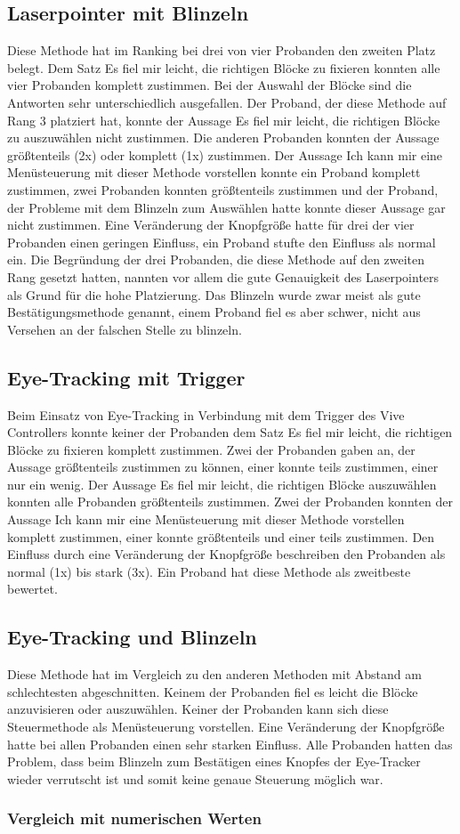 \subsection{Laserpointer mit Blinzeln}
Diese Methode hat im Ranking bei drei von vier Probanden den zweiten Platz belegt. Dem Satz \glqq Es fiel mir leicht, die richtigen Blöcke zu fixieren\grqq{} konnten alle vier Probanden komplett zustimmen. Bei der Auswahl der Blöcke sind die Antworten sehr unterschiedlich ausgefallen. Der Proband, der diese Methode auf Rang 3 platziert hat, konnte der Aussage \glqq Es fiel mir leicht, die richtigen Blöcke zu auszuwählen\grqq{} nicht zustimmen. Die anderen Probanden konnten der Aussage größtenteils (2x) oder komplett (1x) zustimmen. Der Aussage \glqq Ich kann mir eine Menüsteuerung mit dieser Methode vorstellen\grqq{} konnte ein Proband komplett zustimmen, zwei Probanden konnten größtenteils zustimmen und der Proband, der Probleme mit dem Blinzeln zum Auswählen hatte konnte dieser Aussage gar nicht zustimmen. Eine Veränderung der Knopfgröße hatte für drei der vier Probanden einen geringen Einfluss, ein Proband stufte den Einfluss als normal ein. Die Begründung der drei Probanden, die diese Methode auf den zweiten Rang gesetzt hatten, nannten vor allem die gute Genauigkeit des Laserpointers als Grund für die hohe Platzierung. Das Blinzeln wurde zwar meist als gute Bestätigungsmethode genannt, einem Proband fiel es aber schwer, nicht aus Versehen an der falschen Stelle zu blinzeln. 
\subsection{Eye-Tracking mit Trigger}
Beim Einsatz von Eye-Tracking in Verbindung mit dem Trigger des Vive Controllers konnte keiner der Probanden dem Satz \grqq Es fiel mir leicht, die richtigen Blöcke zu fixieren\grqq{} komplett zustimmen. Zwei der Probanden gaben an, der Aussage größtenteils zustimmen zu können, einer konnte teils zustimmen, einer nur ein wenig. Der Aussage \grqq Es fiel mir leicht, die richtigen Blöcke auszuwählen\grqq{} konnten alle Probanden größtenteils zustimmen. Zwei der Probanden konnten der Aussage \grqq Ich kann mir eine Menüsteuerung mit dieser Methode vorstellen\grqq{} komplett zustimmen, einer konnte größtenteils und einer teils zustimmen. Den Einfluss durch eine Veränderung der Knopfgröße beschreiben den Probanden als normal (1x) bis stark (3x). Ein Proband hat diese Methode als zweitbeste bewertet.
\subsection{Eye-Tracking und Blinzeln}
Diese Methode hat im Vergleich zu den anderen Methoden mit Abstand am schlechtesten abgeschnitten. Keinem der Probanden fiel es leicht die Blöcke anzuvisieren oder auszuwählen. Keiner der Probanden kann sich diese Steuermethode als Menüsteuerung vorstellen. Eine Veränderung der Knopfgröße hatte bei allen Probanden einen sehr starken Einfluss. Alle Probanden hatten das Problem, dass beim Blinzeln zum Bestätigen eines Knopfes der Eye-Tracker wieder verrutscht ist und somit keine genaue Steuerung möglich war. 
\subsubsection{Vergleich mit numerischen Werten}
